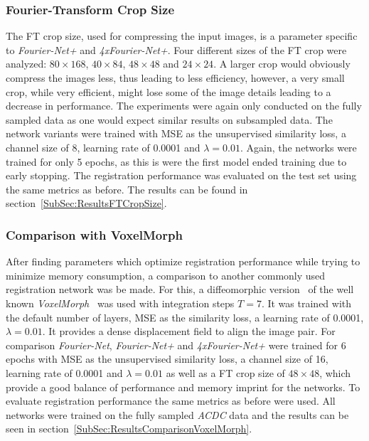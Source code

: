 \subsubsection{Fourier-Transform Crop Size} \label{SubSubSec:FTCropSize}
The FT crop size, used for compressing the input images, is a parameter specific to \emph{Fourier-Net+} and \emph{4xFourier-Net+}. Four different sizes of the FT crop were analyzed: $80 \times 168$, $40 \times 84$, $48 \times 48$ and $24 \times 24$. A larger crop would obviously compress the images less, thus leading to less efficiency, however, a very small crop, while very efficient, might lose some of the image details leading to a decrease in performance. The experiments were again only conducted on the fully sampled data as one would expect similar results on subsampled data. The network variants were trained with MSE as the unsupervised similarity loss, a channel size of 8, learning rate of 0.0001 and $\lambda=0.01$. Again, the networks were trained for only 5 epochs, as this is were the first model ended training due to early stopping. The registration performance was evaluated on the test set using the same metrics as before. The results can be found in section~\ref{SubSec:ResultsFTCropSize}.


\subsubsection{Comparison with VoxelMorph} \label{SubSubSec:ComparisonVoxelMorph}
After finding parameters which optimize registration performance while trying to minimize memory consumption, a comparison to another commonly used registration network was be made. For this, a diffeomorphic version~\cite{VoxelMorphDiff} of the well known \emph{VoxelMorph}~\cite{Voxelmorph} was used with integration steps $T=7$. It was trained with the default number of layers, MSE as the similarity loss, a learning rate of 0.0001, $\lambda=0.01$. It provides a dense displacement field to align the image pair. For comparison \emph{Fourier-Net}, \emph{Fourier-Net+} and \emph{4xFourier-Net+} were trained for 6 epochs with MSE as the unsupervised similarity loss, a channel size of 16, learning rate of 0.0001 and $\lambda=0.01$ as well as a FT crop size of $48 \times 48$, which provide a good balance of performance and memory imprint for the networks. To evaluate registration performance the same metrics as before were used. All networks were trained on the fully sampled \emph{ACDC} data and the results can be seen in section~\ref{SubSec:ResultsComparisonVoxelMorph}.



